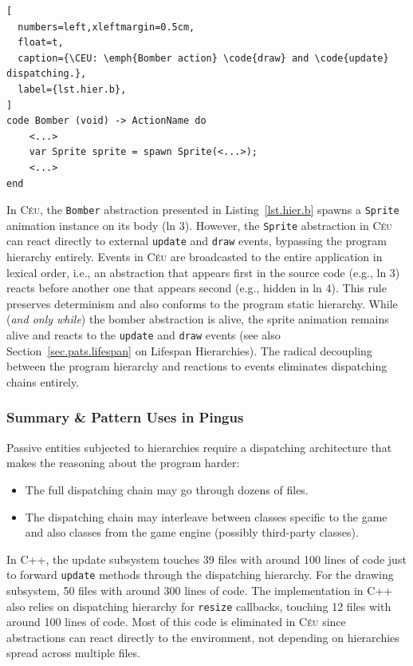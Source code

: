 \documentclass[10pt, conference, compsocconf]{IEEEtran}
\newcommand{\CEU}{\textsc{C\'{e}u}\xspace}
\newcommand{\code}[1] {{\small{\texttt{#1}}}}
\begin{document}
\begin{lstlisting}[
  numbers=left,xleftmargin=0.5cm,
  float=t,
  caption={\CEU: \emph{Bomber action} \code{draw} and \code{update} dispatching.},
  label={lst.hier.b},
]
code Bomber (void) -> ActionName do
    <...>
    var Sprite sprite = spawn Sprite(<...>);
    <...>
end
\end{lstlisting}

In \CEU, the \code{Bomber} abstraction presented in Listing~\ref{lst.hier.b}
spawns a \code{Sprite} animation instance on its body (ln 3).
%
However, the \code{Sprite} abstraction in \CEU can react directly to external
\code{update} and \code{draw} events, bypassing the program hierarchy entirely.
Events in \CEU are broadcasted to the entire application in lexical order,
i.e., an abstraction that appears first in the source code (e.g., ln 3) reacts
before another one that appears second (e.g., hidden in ln 4).
This rule preserves determinism and also conforms to the program static
hierarchy.
While (\emph{and only while}) the bomber abstraction is alive, the sprite
animation remains alive and reacts to the \code{update} and \code{draw} events
(see also Section~\ref{sec.pats.lifespan} on Lifespan Hierarchies).
The radical decoupling between the program hierarchy and reactions to events
eliminates dispatching chains entirely.

\subsubsection{Summary \& Pattern Uses in Pingus}

Passive entities subjected to hierarchies require a dispatching architecture
that makes the reasoning about the program harder:

\begin{itemize}
\item The full dispatching chain may go through dozens of files.
\item The dispatching chain may interleave between classes specific to the game
      and also classes from the game engine (possibly third-party classes).
\end{itemize}

In C++, the update subsystem touches 39 files with around 100 lines of code
just to forward \code{update} methods through the dispatching hierarchy.
For the drawing subsystem, 50 files with around 300 lines of code.
The implementation in C++ also relies on dispatching hierarchy for
\code{resize} callbacks, touching 12 files with around 100 lines of code.
%
Most of this code is eliminated in \CEU since abstractions can react directly
to the environment, not depending on hierarchies spread across multiple files.
\end{document}
